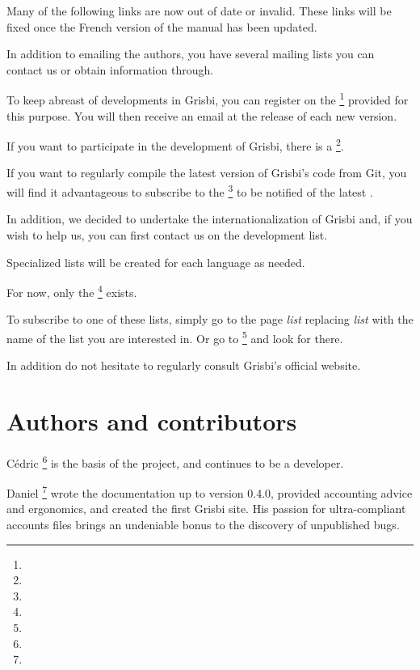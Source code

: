 Many of the following links are now out of date or invalid.  These links will be fixed once the French version of the manual has been updated.

In addition to emailing the authors, you have several mailing lists you can contact us or obtain information through.

To keep abreast of developments in Grisbi, you can register on the \footnote{\urlListInfoEmail{}} provided for this purpose.  You will then receive an email at the release of each new version.

If you want to participate in the development of Grisbi, there is a \footnote{\urlListDevelEmail{}}.

If you want to regularly compile the latest version of Grisbi's code from \gls{Git}, you will find it advantageous to subscribe to the \footnote{\urlListCVSEmail{}} to be notified of the latest .

In addition, we decided to undertake the internationalization of Grisbi and, if you wish to help us, you can first contact us on the development list.

Specialized lists will be created for each language as needed.

For now, only the \footnote{\urlListAnglaiseEmail{}} exists.

To subscribe to one of these lists, simply go to the page
\urlListSF{}\emph{list} replacing \emph{list} with the name of the list you are interested in. Or go to 
\footnote{\urlGrisbi{}} and look for  there.

In addition do not hesitate to regularly consult Grisbi's official website.


\newpage

\section{Authors and contributors\label{introduction-authors}}

{Cédric }\footnote{\urlCedricAugerEmail{}} is the basis of the project, and continues to be a developer.

{Daniel }\footnote{\urlDanielCartronEmail{}} wrote the documentation up to version 0.4.0, provided accounting advice and ergonomics, and created the first Grisbi site. His passion for ultra-compliant accounts files brings an undeniable bonus to the discovery of unpublished bugs.

